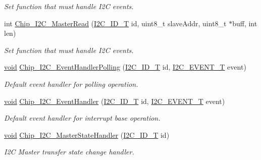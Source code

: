 \begin{DoxyCompactItemize}
\begin{DoxyCompactList}\small\item\em Set function that must handle I2\-C events. \end{DoxyCompactList}\item 
int \hyperlink{group__I2C__17XX__40XX_gae816049843eb162c803b5058ebd9a25c}{Chip\-\_\-\-I2\-C\-\_\-\-Master\-Read} (\hyperlink{group__I2C__17XX__40XX_ga957556a4d900506cd4cba8427afd81e6}{I2\-C\-\_\-\-I\-D\-\_\-\-T} id, uint8\-\_\-t slave\-Addr, uint8\-\_\-t $\ast$buff, int len)
\begin{DoxyCompactList}\small\item\em Set function that must handle I2\-C events. \end{DoxyCompactList}\item 
\hyperlink{Paradigm_2Tern__EE_2small_2portmacro_8h_a14d32f8130d3c0b212cfc751730b5b49}{void} \hyperlink{group__I2C__17XX__40XX_gaaa89a66d658a41325b3c5e56bc059401}{Chip\-\_\-\-I2\-C\-\_\-\-Event\-Handler\-Polling} (\hyperlink{group__I2C__17XX__40XX_ga957556a4d900506cd4cba8427afd81e6}{I2\-C\-\_\-\-I\-D\-\_\-\-T} id, \hyperlink{group__I2C__17XX__40XX_gacb2cd4e03ea48339d327e4f387441bf3}{I2\-C\-\_\-\-E\-V\-E\-N\-T\-\_\-\-T} event)
\begin{DoxyCompactList}\small\item\em Default event handler for polling operation. \end{DoxyCompactList}\item 
\hyperlink{Paradigm_2Tern__EE_2small_2portmacro_8h_a14d32f8130d3c0b212cfc751730b5b49}{void} \hyperlink{group__I2C__17XX__40XX_ga06b84fe3fad7ffd4ccb93f2683781936}{Chip\-\_\-\-I2\-C\-\_\-\-Event\-Handler} (\hyperlink{group__I2C__17XX__40XX_ga957556a4d900506cd4cba8427afd81e6}{I2\-C\-\_\-\-I\-D\-\_\-\-T} id, \hyperlink{group__I2C__17XX__40XX_gacb2cd4e03ea48339d327e4f387441bf3}{I2\-C\-\_\-\-E\-V\-E\-N\-T\-\_\-\-T} event)
\begin{DoxyCompactList}\small\item\em Default event handler for interrupt base operation. \end{DoxyCompactList}\item 
\hyperlink{Paradigm_2Tern__EE_2small_2portmacro_8h_a14d32f8130d3c0b212cfc751730b5b49}{void} \hyperlink{group__I2C__17XX__40XX_ga179362e42a3de931ff7f57ca698254fa}{Chip\-\_\-\-I2\-C\-\_\-\-Master\-State\-Handler} (\hyperlink{group__I2C__17XX__40XX_ga957556a4d900506cd4cba8427afd81e6}{I2\-C\-\_\-\-I\-D\-\_\-\-T} id)
\begin{DoxyCompactList}\small\item\em I2\-C Master transfer state change handler. \end{DoxyCompactList}\item 

\end{DoxyCompactItemize}

